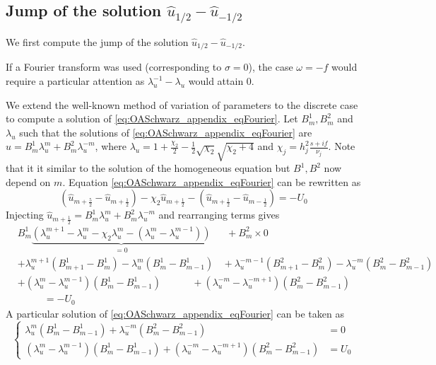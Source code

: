 \subsection{Jump of the solution
	$\widehat{u}_{1/2} - \widehat{u}_{-1/2}$}
We first compute the jump of the solution
$\widehat{u}_{1/2} - \widehat{u}_{-1/2}$.
\begin{remark}
	If a Fourier transform was used
	(corresponding to $\sigma=0$), the case $\omega=-f$ would
	require a particular attention as
	$\lambda_u^{-1} - \lambda_u$ would attain 0.
\end{remark}
We extend the well-known method of variation of parameters to the
discrete case to compute a solution of
\eqref{eq:OASchwarz_appendix_eqFourier}.
Let $B_m^1, B_m^2$ and $\lambda_u$ such that
the solutions of \eqref{eq:OASchwarz_appendix_eqFourier} are
$\widehat{u} = B^1_m \lambda_u^m + B^2_m \lambda_u^{-m}$, where
$\lambda_u=1+\frac{\chi_2}{2}
-\frac{1}{2}\sqrt{\chi_2}\sqrt{\chi_2+4}$ and
$\chi_j = h_j^2 \frac{s + if}{\nu_j}$.
Note that it it similar to the solution of the homogeneous
equation but $B^1, B^2$ now depend on $m$.
	Equation \eqref{eq:OASchwarz_appendix_eqFourier}
	can be rewritten as
	\begin{equation}
		(\widehat{u}_{m+\frac{5}{2}} - \widehat{u}_{m+\frac{1}{2}})
		-\chi_2 \widehat{u}_{m+\frac{1}{2}}
		- (\widehat{u}_{m+\frac{1}{2}} - \widehat{u}_{m-\frac{1}{2}})
		= -U_0
	\end{equation}
	Injecting $\widehat{u}_{m+\frac{1}{2}} = B^1_m \lambda_u^m +
	B^2_m \lambda_u^{-m}$ and rearranging terms gives
\begin{equation}
	\begin{aligned}
	&B^1_m \underbrace{\left(
		\lambda_u^{m+1} - \lambda_u^m - \chi_2 \lambda_u^m
		- (\lambda_u^{m} - \lambda_u^{m-1})
		\right)}_{=0} ~~~~~~~+ B^2_m \times 0 \\
	&+ \lambda_u^{m+1} (B_{m+1}^1 - B_m^1)
		- \lambda_u^{m} (B_{m}^1 - B_{m-1}^1)
		~~~~+ \lambda_u^{-m-1} (B_{m+1}^2 - B_m^2)
		- \lambda_u^{-m} (B_{m}^2 - B_{m-1}^2)
		\\
	&+ (\lambda_u^m - \lambda_u^{m-1})(B_{m}^1 - B_{m-1}^1)
		~~~~~~~~~~~~~~+ (\lambda_u^{-m} - \lambda_u^{-m+1})
				(B_{m}^2 - B_{m-1}^2)\\
		&~~~~~~~~~~~~= -U_0
	\end{aligned}
\end{equation}
A particular solution of \eqref{eq:OASchwarz_appendix_eqFourier}
can be taken as
\begin{equation}
\begin{cases}
	\lambda_u^m(B_m^1 - B_{m-1}^1)
	+ \lambda_u^{-m}(B_m^2 - B_{m-1}^2)&= 0 \\
	(\lambda_u^m - \lambda_u^{m-1})(B_m^1 - B_{m-1}^1)
	+ (\lambda_u^{-m} - \lambda_u^{-m+1})(B_m^2 - B_{m-1}^2)
	&= {U_0}
\end{cases}
\end{equation}
